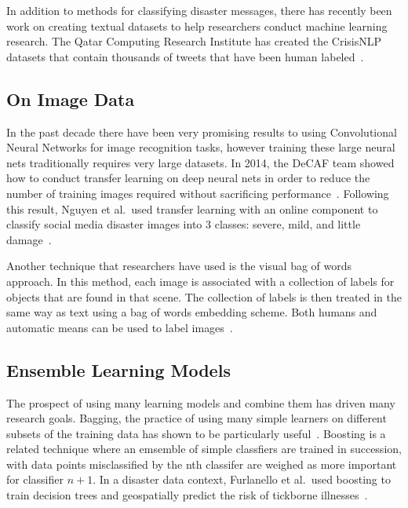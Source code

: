 In addition to methods for classifying disaster messages, there has recently been work 
on creating textual datasets to help researchers conduct machine learning research. 
The Qatar Computing Research Institute has created the CrisisNLP datasets that 
contain thousands of tweets that have been human labeled~\cite{nguyenRapidClassificationCrisisRelated}.

\subsection{On Image Data}\label{chap3:image}
In the past decade there have been very promising results to using Convolutional Neural Networks
for image recognition tasks, however training these large neural nets traditionally
requires very large datasets. In 2014, the DeCAF team showed how to conduct 
transfer learning on deep neural nets in order to reduce the number of 
training images required without sacrificing performance~\cite{donahueDeCAFDeepConvolutional2013}.
Following this result, Nguyen et al.\ used transfer learning with an online component 
to classify social media disaster images into 3 classes: severe, mild, and little
damage~\cite{nguyenDamageAssessmentSocial2017}. 

Another technique that researchers have used is the visual bag of words
approach. In this method, each image is associated with a collection of labels
for objects that are found in that scene. The collection of labels is then
treated in the same way as text using a bag of words embedding scheme. Both
humans and automatic means can be used to label
images~\cite{jomaaSemanticVisualCues2016}.

\subsection{Ensemble Learning Models}
  The prospect of using many learning models and combine them has driven many 
  research goals. Bagging, the practice of using many simple learners on
  different subsets of the training data has shown to be particularly
  useful~\cite{breimanBaggingPredictors1996}.  Boosting is a related technique
  where an emsemble of simple classfiers are trained in succession, with
  data points misclassified by the nth classifer are weighed as more important
  for classifier $n+1$. In a disaster data context, Furlanello et al.\ used
  boosting to train decision trees and geospatially predict the risk of
  tickborne illnesses~\cite{furlanelloBoostingTreeBasedClassifiers2000}.
  
